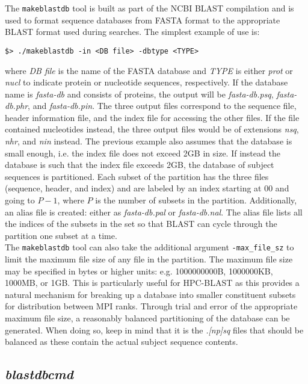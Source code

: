 \documentclass[10pt]{article}
\begin{document}
The \verb^makeblastdb^ tool is built as part of the NCBI BLAST compilation and is used to format sequence databases from FASTA format to the appropriate BLAST format used during searches.  The simplest example of
use is:
\begin{verbatim}
$> ./makeblastdb -in <DB file> -dbtype <TYPE>
\end{verbatim}
\noindent where \emph{DB file} is the name of the FASTA database and \emph{TYPE} is either \emph{prot} or \emph{nucl} to indicate protein or nucleotide sequences, respectively.  If the database name is \emph{fasta-db} and
consists of proteins, the output will be \emph{fasta-db.psq}, \emph{fasta-db.phr}, and \emph{fasta-db.pin}.  The three output files correspond to the sequence file, header information file, and the index file for accessing the other files.
If the file contained nucleotides instead, the three output files would be of extensions \emph{nsq}, \emph{nhr}, and \emph{nin} instead.  The previous example also assumes that the database is small enough, i.e. the index file does
not exceed 2GB in size.  If instead the database is such that the index file exceeds 2GB, the database of subject sequences is partitioned.  Each subset of the partition has the three files (sequence, header, and index) and are labeled by an index starting at \(00\)
and going to \(P-1\), where \(P\) is the number of subsets in the partition.  Additionally, an alias file is created: either as \emph{fasta-db.pal} or \emph{fasta-db.nal}.  The alias file lists all the indices of the subsets in the set so that BLAST can cycle
through the partition one subset at a time.\\

\noindent The \verb^makeblastdb^ tool can also take the additional argument \verb^-max_file_sz^ to limit the maximum file size of any file in the partition.  The maximum file size may be specified in bytes or higher units: e.g. 1000000000B, 
1000000KB, 1000MB, or 1GB.  This is particularly useful for HPC-BLAST as this provides a natural mechanism for breaking up a database into smaller constituent subsets for distribution between MPI ranks.  Through trial and error of the
appropriate maximum file size, a reasonably balanced partitioning of the database can be generated.  When doing so, keep in mind that it is the \emph{.[np]sq} files that should be balanced as these contain the actual subject sequence contents.

\subsection{\emph{blastdbcmd}} \label{ssec:blastdbcmd}
\end{document}
